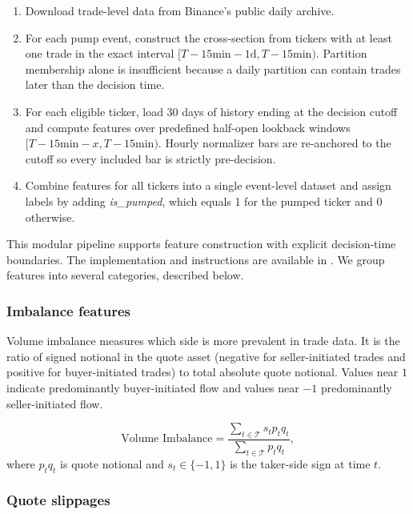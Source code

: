 \documentclass{ieeeaccess}
\begin{document}
\begin{enumerate}
    \item Download trade-level data from Binance's public daily archive.
    \item For each pump event, construct the cross-section from tickers with at least one trade in the exact interval $[T-15\text{min}-1\text{d},T-15\text{min})$. Partition membership alone is insufficient because a daily partition can contain trades later than the decision time.
    \item For each eligible ticker, load 30 days of history ending at the decision cutoff and compute features over predefined half-open lookback windows $[T-15\text{min}-x,T-15\text{min})$. Hourly normalizer bars are re-anchored to the cutoff so every included bar is strictly pre-decision.
    \item Combine features for all tickers into a single event-level dataset and assign labels by adding \textit{is\_pumped}, which equals 1 for the pumped ticker and 0 otherwise.
\end{enumerate}

This modular pipeline \textcolor{revisionblue}{supports} feature \textcolor{revisionblue}{construction with explicit decision-time boundaries. The implementation and instructions are available} in \cite{code_github}. We group features into several categories, described below.

\subsubsection{Imbalance features}

Volume imbalance measures which side is more prevalent in trade data. It is the ratio of signed notional in the quote asset (negative for seller-initiated trades and positive for buyer-initiated trades) to total absolute quote notional. Values near $1$ indicate predominantly buyer-initiated flow and values near $-1$ predominantly seller-initiated flow.

\begin{equation}
    \text{Volume Imbalance} = \frac{\sum_{t \in \mathcal{T}}s_t p_t q_t}{\sum_{t \in \mathcal{T}}p_t q_t},
    \label{eq:volume_imbalance}
\end{equation}
where $p_tq_t$ is quote notional and $s_t\in\{-1,1\}$ is the taker-side sign at time $t$.

\subsubsection{Quote slippages}
\end{document}
